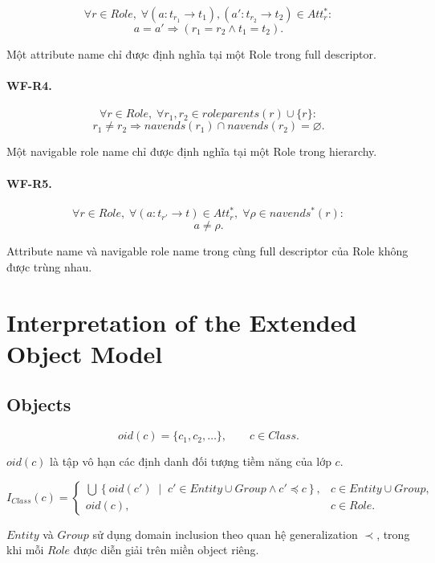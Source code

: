 \documentclass[12pt,a4paper]{article}
\theoremstyle{definition}
\begin{document}
\[
\forall r\in Role,\;
\forall
(a:t_{r_1}\to t_1),
(a':t_{r_2}\to t_2)
\in Att_r^{*}:
\]
\[
a=a'
\Rightarrow
(r_1=r_2\land t_1=t_2).
\tag{WF-R2}
\]

Một attribute name chỉ được định nghĩa tại một Role trong full descriptor.


\paragraph{WF-R4.}

\[
\forall r\in Role,\;
\forall r_1,r_2\in roleparents(r)\cup\{r\}:
\]
\[
r_1\neq r_2
\Rightarrow
navends(r_1)\cap navends(r_2)
=
\varnothing.
\tag{WF-R4}
\]

Một navigable role name chỉ được định nghĩa tại một Role trong hierarchy.


\paragraph{WF-R5.}

\[
\forall r\in Role,\;
\forall(a:t_{r'}\to t)\in Att_r^{*},\;
\forall \rho\in navends^{*}(r):
\]
\[
a\neq \rho.
\tag{WF-R5}
\]

Attribute name và navigable role name trong cùng full descriptor của Role
không được trùng nhau.





\section{Interpretation of the Extended Object Model}
\subsection{Objects}

\[
oid(c)=\{c_1,c_2,\ldots\},
\qquad
c\in Class.
\]

$oid(c)$ là tập vô hạn các định danh đối tượng tiềm năng của lớp $c$.

\[
I_{Class}(c)
=
\begin{cases}
\displaystyle
\bigcup
\left\{
oid(c')
\;\middle|\;
c'\in Entity\cup Group
\land
c'\preceq c
\right\},
&
c\in Entity\cup Group,
\\[5mm]
oid(c),
&
c\in Role.
\end{cases}
\]

$Entity$ và $Group$ sử dụng domain inclusion theo quan hệ
generalization $\prec$, trong khi mỗi $Role$ được diễn giải trên miền
object riêng.
\end{document}
